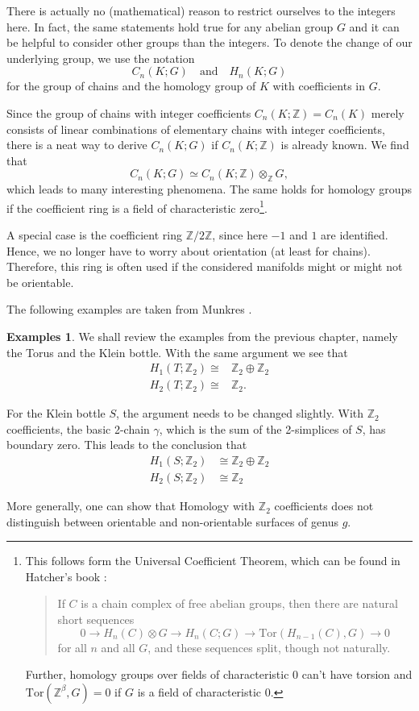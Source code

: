 \documentclass[toc=bib, headinclude]{scrartcl}
\theoremstyle{plain}
\theoremstyle{definition}
\newtheorem{examples}[theorem]{Examples}
\theoremstyle{remark}
\newcommand{\isom}{\cong}
\newcommand{\Z}{\mathbb{Z}}
\newcommand{\qandq}{\quad \text{and} \quad}
\begin{document}
There is actually no (mathematical) reason to restrict ourselves to the integers here. In fact, the same statements hold true for any abelian group $G$ and it can be helpful to consider other groups than the integers. To denote the change of our underlying group, we use the notation
\[
C_n(K;G)\qandq H_n(K;G)
\]
for the group of chains and the homology group of $K$ with coefficients in $G$.

Since the group of chains with integer coefficients $C_n(K;\Z)=C_n(K)$ merely consists of linear combinations of elementary chains with integer coefficients, there is a neat way to derive $C_n(K;G)$ if $C_n(K;\Z)$ is already known. We find that
\[
C_n(K;G)\simeq C_n(K;\Z)\otimes_\Z G,
\]
which leads to many interesting phenomena. The same holds for homology groups if the coefficient ring is a field of characteristic zero\footnote{This follows form the Universal Coefficient Theorem, which can be found in Hatcher's book \parencite[Theorem 3A.3]{ha}:
\begin{quotation}
	If $C$ is a chain complex of free abelian groups, then there are natural short sequences
	\[
	0\rightarrow H_n(C)\otimes G\rightarrow H_n(C;G)\rightarrow\mathrm{Tor}(H_{n-1}(C),G)\rightarrow 0
	\]
	for all $n$ and all $G$, and these sequences split, though not naturally.
\end{quotation}
Further, homology groups over fields of characteristic 0 can't have torsion and $\mathrm{Tor}(\Z^\beta,G)=0$ if $G$ is a field of characteristic 0.
}.





A special case is the coefficient ring $\Z/2\Z$, since here $-1$ and $1$ are identified. Hence, we no longer have to worry about orientation (at least for chains). Therefore, this ring is often used if the considered manifolds might or might not be orientable.


The following examples are taken from Munkres \parencite[Example 1, p. 52]{mu}.
\begin{examples}
	We shall review the examples from the previous chapter, namely the Torus and the Klein bottle. With the same argument we see that
	\begin{align*}
		H_1(T;\Z_2)\isom& \Z_2\oplus\Z_2\\
		H_2(T;\Z_2)\isom& \Z_2.
	\end{align*}
	
	For the Klein bottle $S$, the argument needs to be changed slightly. With $\Z_2$ coefficients, the basic 2-chain $\gamma$, which is the sum of the 2-simplices of $S$, has boundary zero. This leads to the conclusion that 
	\begin{align*}
		H_1(S;\Z_2)&\isom \Z_2\oplus \Z_2\\
		H_2(S;\Z_2)&\isom \Z_2
	\end{align*}

	More generally, one can show that Homology with $\Z_2$ coefficients does not distinguish between orientable and non-orientable surfaces of genus $g$.
\end{examples}
\end{document}
